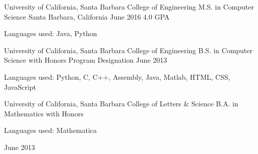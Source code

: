 \begin{cventries}
  \cventry
    {University of California, Santa Barbara \newline College of Engineering}
    {M.S. in Computer Science%
}
    {Santa Barbara, California}
    {June 2016 \newline\vspace{-1mm} 4.0 GPA}
    {
    \begin{cvitems}
	\item {\scriptsize{Languages used: Java, Python}}
	\end{cvitems}
    }
\cventry
    {University of California, Santa Barbara \newline College of Engineering}
    {B.S. in Computer Science\newline\vspace{-1mm} {\scriptsize \textmd{with Honors Program Designation}}}
    {}
    {June 2013}{
    \begin{cvitems}
	\item {\scriptsize{Languages used: Python, C, C++, Assembly, Java, Matlab, HTML, CSS, JavaScript}}
	\end{cvitems}
}
\cventry
    {University of California, Santa Barbara \newline College of Letters \& Science}
    {B.A. in Mathematics \newline\vspace{-1mm} {\scriptsize \textmd{with Honors}}}
    {    \begin{cvitems}
	\item {\scriptsize{Languages used: Mathematica}}
	\end{cvitems}}
    {June 2013}{}
\end{cventries}